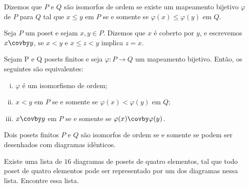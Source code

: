 \begin{definition}
	Dizemos que $P$ e $Q$ são isomorfos de ordem se existe um mapeamento bijetivo $\varphi$ de $P$ para $Q$ tal que $x \leq y$ em $P$ se e somente se $\varphi(x) \leq \varphi(y)$ em $Q$.
\end{definition}
	
\begin{definition}
	Seja $P$ um poset e sejam $x, y \in P$. Dizemos que $x$ é coberto por $y$, e escrevemos $x \covby y$, se $x < y$ e $x \leq z < y$ implica $z = x$.
\end{definition}

\begin{exercise}
	Sejam P e Q posets finitos e seja ${\varphi}:P \to Q$ um mapeamento bijetivo. Então, os seguintes são equivalentes:
	\begin{enumerate}[(i)]
		\item $\varphi$ é um isomorfismo de ordem;
		\item $x < y$ em $P$ se e somente se $\varphi(x) < \varphi(y)$ em $Q$;
		\item $x \covby y$ em $P$ se e somente se $\varphi(x) \covby \varphi(y)$.
	\end{enumerate}
\end{exercise}

\begin{exercise}
	Dois posets finitos $P$ e $Q$ são isomorfos de ordem se e somente se podem ser desenhados com diagramas idênticos.
\end{exercise}

\begin{exercise}
	Existe uma lista de $16$ diagramas de posets de quatro elementos, tal que todo poset de quatro elementos pode ser representado por um dos diagramas nessa lista. Encontre essa lista.
\end{exercise}
